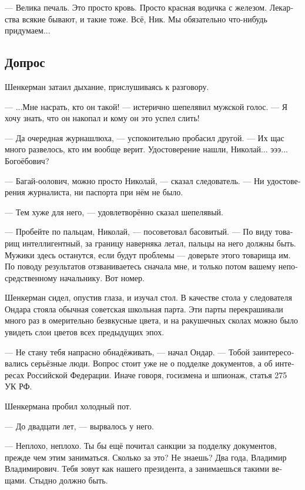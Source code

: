 \documentclass[a5paper,12pt,fleqn]{extbook}\usepackage{cooltooltips}\usepackage{polyglossia}\setdefaultlanguage[babelshorthands=true]{russian}\setotherlanguage{english}\defaultfontfeatures{Ligatures=TeX,Mapping=tex-text} \usepackage{xcolor}\definecolor{lightgray}{HTML}{bbbbbb}\color{lightgray}\newcommand{\ml}[3]{\textenglish{\textcolor{black}{#3}}}
\newcommand{\asterism}{\vspace{1em}{\centering\Large\bfseries$\ast~\ast~\ast$\par}\vspace{1em}}
\begin{document}
--- Велика печаль.
Это просто кровь.
Просто красная водичка с железом.
Лекарства всякие бывают, и такие тоже.
Всё, Ник.
Мы обязательно что-нибудь придумаем...

\subsection{Допрос}

Шенкерман затаил дыхание, прислушиваясь к разговору.

--- ...Мне насрать, кто он такой! --- истерично шепелявил мужской голос.
--- Я хочу знать, что он накопал и кому он это успел слить!

--- Да очередная журнашлюха, --- успокоительно пробасил другой.
--- Их щас много развелось, кто им вообще верит.
Удостоверение нашли, Николай... эээ... Богоёбович?

--- Багай-оолович, можно просто Николай, --- сказал следователь.
--- Ни удостоверения журналиста, ни паспорта при нём не было.

--- Тем хуже для него, --- удовлетворённо сказал шепелявый.

--- Пробейте по пальцам, Николай, --- посоветовал басовитый.
--- По виду товарищ интеллигентный, за границу наверняка летал, пальцы на него должны быть.
Мужики здесь останутся, если будут проблемы --- доверьте этого товарища им.
По поводу результатов отзваниваетесь сначала мне, и только потом вашему непосредственному начальнику.
Вот номер.

\asterism

Шенкерман сидел, опустив глаза, и изучал стол.
В качестве стола у следователя Ондара стояла обычная советская школьная парта.
Эти парты перекрашивали много раз в омерительно безвкусные цвета, и на ракушечных сколах можно было увидеть слои цветов всех предыдущих эпох.

--- Не стану тебя напрасно обнадёживать, --- начал Ондар.
--- Тобой заинтересовались серьёзные люди.
Вопрос стоит уже не о подделке документов, а об интересах Российской Федерации.
Иначе говоря, госизмена и шпионаж, статья 275 УК РФ.

Шенкермана пробил холодный пот.

--- До двадцати лет, --- вырвалось у него.

--- Неплохо, неплохо.
Ты бы ещё почитал санкции за подделку документов, прежде чем этим заниматься.
Сколько за это?
Не знаешь?
Два года, Владимир Владимирович.
Тебя зовут как нашего президента, а занимаешься такими вещами.
Стыдно должно быть.
\end{document}
